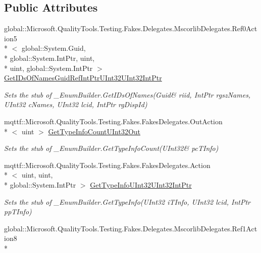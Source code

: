 \subsection*{Public Attributes}
\begin{DoxyCompactItemize}
\item 
global\-::\-Microsoft.\-Quality\-Tools.\-Testing.\-Fakes.\-Delegates.\-Mscorlib\-Delegates.\-Ref0\-Action5\\*
$<$ global\-::\-System.\-Guid, \\*
global\-::\-System.\-Int\-Ptr, uint, \\*
uint, global\-::\-System.\-Int\-Ptr $>$ \hyperlink{class_system_1_1_runtime_1_1_interop_services_1_1_fakes_1_1_stub___enum_builder_a940241d6ab27aa7ac06698d7c853e757}{Get\-I\-Ds\-Of\-Names\-Guid\-Ref\-Int\-Ptr\-U\-Int32\-U\-Int32\-Int\-Ptr}
\begin{DoxyCompactList}\small\item\em Sets the stub of \-\_\-\-Enum\-Builder.\-Get\-I\-Ds\-Of\-Names(Guid\& riid, Int\-Ptr rgsz\-Names, U\-Int32 c\-Names, U\-Int32 lcid, Int\-Ptr rg\-Disp\-Id)\end{DoxyCompactList}\item 
mqttf\-::\-Microsoft.\-Quality\-Tools.\-Testing.\-Fakes.\-Fakes\-Delegates.\-Out\-Action\\*
$<$ uint $>$ \hyperlink{class_system_1_1_runtime_1_1_interop_services_1_1_fakes_1_1_stub___enum_builder_a8b9349961a414cc53b2c75d0eb0aaca5}{Get\-Type\-Info\-Count\-U\-Int32\-Out}
\begin{DoxyCompactList}\small\item\em Sets the stub of \-\_\-\-Enum\-Builder.\-Get\-Type\-Info\-Count(U\-Int32\& pc\-T\-Info)\end{DoxyCompactList}\item 
mqttf\-::\-Microsoft.\-Quality\-Tools.\-Testing.\-Fakes.\-Fakes\-Delegates.\-Action\\*
$<$ uint, uint, \\*
global\-::\-System.\-Int\-Ptr $>$ \hyperlink{class_system_1_1_runtime_1_1_interop_services_1_1_fakes_1_1_stub___enum_builder_aac0df3c4f27c61f08463b8101f55c649}{Get\-Type\-Info\-U\-Int32\-U\-Int32\-Int\-Ptr}
\begin{DoxyCompactList}\small\item\em Sets the stub of \-\_\-\-Enum\-Builder.\-Get\-Type\-Info(\-U\-Int32 i\-T\-Info, U\-Int32 lcid, Int\-Ptr pp\-T\-Info)\end{DoxyCompactList}\item 
global\-::\-Microsoft.\-Quality\-Tools.\-Testing.\-Fakes.\-Delegates.\-Mscorlib\-Delegates.\-Ref1\-Action8\\*

\end{DoxyCompactItemize}
